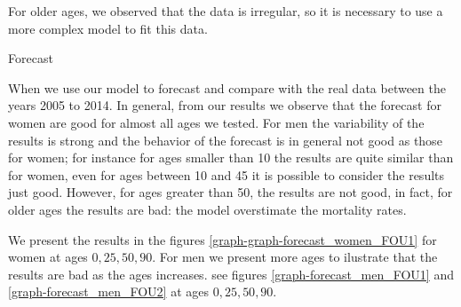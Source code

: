 \documentclass[12pt,reqno]{amsart}
\makeatletter
\def\section{\@startsection{section}{1}%
     \z@{.7\linespacing\@plus\linespacing}{.5\linespacing}%
     {\bfseries
     \centering
     }}
\theoremstyle{definition}
\theoremstyle{remark}
\numberwithin{equation}{section}
\makeatother
\begin{document}
For older ages, we observed that the data is irregular, so it is necessary to use a more complex model to
fit this data.

\section{Forecast}

When we use our model to forecast and compare with the real data between the years 2005 to 2014. In general, from our results we observe that the forecast for women are good for almost all ages we tested. For men the variability of the results is strong and the behavior of the forecast is in general not good as those for women; for instance for ages smaller than 10 the results are quite similar than for women, even for ages between 10 and 45 it is possible to consider the results just good. However, for ages greater than 50, the results are not good, in fact, for older ages the results are bad: the model overstimate the mortality rates.  

We present the results in the figures \ref{graph-graph-forecast_women_FOU1} for women at ages $0,25,50,90$. For men we present more ages to ilustrate that the results are bad as the ages increases. see figures \ref{graph-forecast_men_FOU1} and \ref{graph-forecast_men_FOU2} at ages $0,25,50,90$. 
\end{document}
